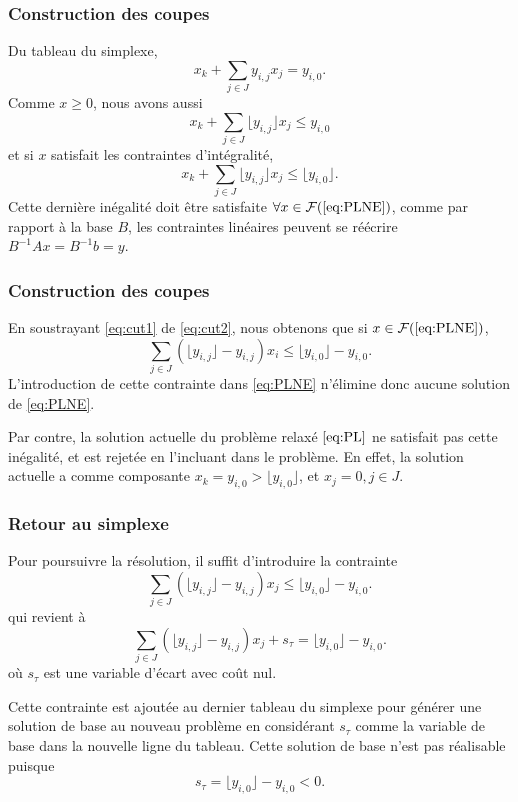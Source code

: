 \documentclass[usepdftitle=false]{beamer}
\def\cF{\mathcal{F}}
\begin{document}
\begin{frame}
\frametitle{Construction des coupes}

Du tableau du simplexe,
\begin{equation}
x_k + \sum_{j \in J} y_{i,j}x_j = y_{i,0}.
\label{eq:cut1}
\end{equation}
Comme $x \geq 0$, nous avons aussi
$$
x_k + \sum_{j \in J} \lfloor y_{i,j} \rfloor x_j \leq y_{i,0}
$$
et si $x$ satisfait les contraintes d'intégralité,
\begin{equation}
x_k + \sum_{j \in J} \lfloor y_{i,j} \rfloor x_j \leq \lfloor y_{i,0} \rfloor.
	\label{eq:cut2}
\end{equation}
Cette dernière inégalité doit être satisfaite $\forall x \in \cF(\ref{eq:PLNE})$, comme par rapport à la base $B$, les contraintes linéaires peuvent se réécrire $B^{-1}Ax = B^{-1}b = y$.

\end{frame}

\begin{frame}
\frametitle{Construction des coupes}

En soustrayant \eqref{eq:cut1} de \eqref{eq:cut2}, nous  obtenons que si $x \in \cF(\ref{eq:PLNE})$,
$$
\sum_{j \in J} \left( \lfloor y_{i,j} \rfloor - y_{i,j} \right) x_i \leq \lfloor y_{i,0} \rfloor - y_{i,0}.
$$
L'introduction de cette contrainte dans \eqref{eq:PLNE} n'élimine donc aucune solution de \eqref{eq:PLNE}.

\mbox{}

Par contre, la solution actuelle du problème relaxé $\eqref{eq:PL}$ ne satisfait pas cette inégalité, et est rejetée en l'incluant dans le problème. En effet, la solution actuelle a comme composante $x_k = y_{i,0} > \lfloor y_{i,0} \rfloor$, et $x_j = 0, j \in J$.

\end{frame}

\begin{frame}
\frametitle{Retour au simplexe}

Pour poursuivre la résolution, il suffit d'introduire la contrainte
$$
\sum_{j \in J} \left( \lfloor y_{i,j} \rfloor - y_{i,j} \right) x_j \leq \lfloor y_{i,0} \rfloor - y_{i,0}.
$$
qui revient à
$$
\sum_{j \in J} \left( \lfloor y_{i,j} \rfloor - y_{i,j} \right) x_j + s_{\tau} = \lfloor y_{i,0} \rfloor - y_{i,0}.
$$
où $s_{\tau}$ est une variable d'écart avec coût nul.

\mbox{}

Cette contrainte est ajoutée au dernier tableau du simplexe pour générer une solution de base au nouveau problème en considérant $s_{\tau}$ comme la variable de base dans la nouvelle ligne du tableau.
Cette solution de base n'est pas réalisable puisque
$$
s_{\tau} = \lfloor y_{i,0} \rfloor - y_{i,0} < 0.
$$

\end{frame}
\end{document}
